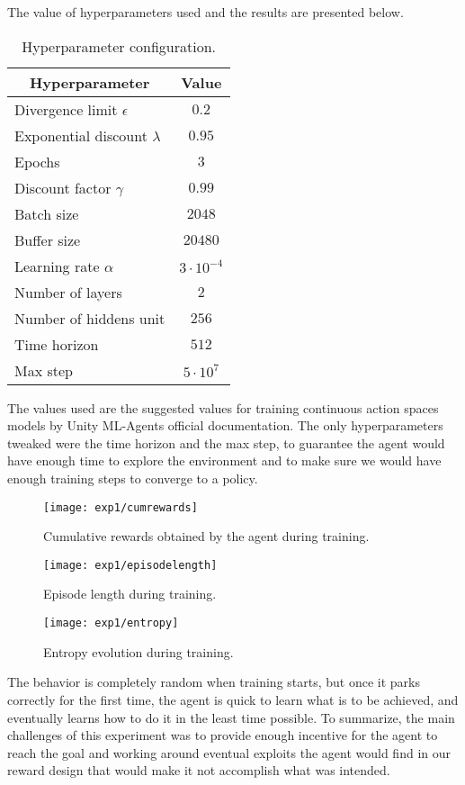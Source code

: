 The value of hyperparameters used and the results are presented below. 
\begin{table}[H]
    \begin{tabular}{|l|c|}
    \hline \multicolumn{1}{|c|}{ Hyperparameter } & Value \\
    \hline Divergence limit $\epsilon$ & $0.2$ \\
    \hline Exponential discount $\lambda$ & $0.95$ \\
    \hline Epochs & $3$ \\
    \hline Discount factor $\gamma$ & $0.99$ \\
    \hline Batch size & $2048$ \\
    \hline Buffer size & $20480$ \\
    \hline Learning rate $\alpha$ & $3 \cdot 10^{-4}$ \\
    \hline Number of layers & $2$ \\
    \hline Number of hiddens unit & $256$ \\
    \hline Time horizon & $512$ \\
    \hline Max step & $5\cdot 10^{7}$ \\
    \hline
    \end{tabular}
    \caption{\label{tab:hyperparameters}Hyperparameter configuration.}
    \end{table}
The values used are the suggested values for training continuous action spaces models by Unity ML-Agents official documentation. The only hyperparameters tweaked were the time horizon and the max step, to guarantee the agent would have enough time to explore the environment and to make sure we would have enough training steps to converge to a policy.
\begin{figure}[H]
    \texttt{[image: exp1/cumrewards]}
    \caption{Cumulative rewards obtained by the agent during training.}
    \label{fig:cumrewards1}
\end{figure}
\begin{figure}[H]
    \texttt{[image: exp1/episodelength]}
    \caption{Episode length during training.}
    \label{fig:episodelength1}
\end{figure}
\begin{figure}[H]
    \texttt{[image: exp1/entropy]}
    \caption{Entropy evolution during training.}
    \label{fig:entropy1}
\end{figure}
The behavior is completely random when training starts, but once it parks correctly for the first time, the agent is quick to learn what is to be achieved, and eventually learns how to do it in the least time possible. To summarize, the main challenges of this experiment was to provide enough incentive for the agent to reach the goal and working around eventual exploits the agent would find in our reward design that would make it not accomplish what was intended.

